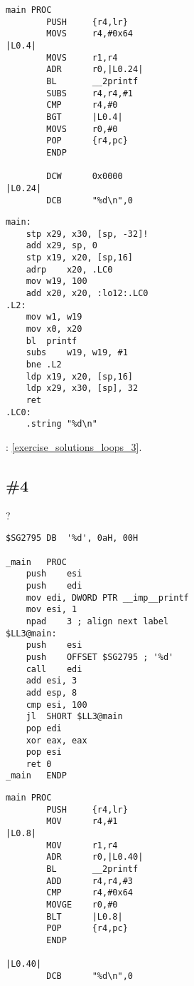 \begin{lstlisting}[caption=\NonOptimizingKeilVI (\ThumbMode)]
main PROC
        PUSH     {r4,lr}
        MOVS     r4,#0x64
|L0.4|
        MOVS     r1,r4
        ADR      r0,|L0.24|
        BL       __2printf
        SUBS     r4,r4,#1
        CMP      r4,#0
        BGT      |L0.4|
        MOVS     r0,#0
        POP      {r4,pc}
        ENDP

        DCW      0x0000
|L0.24|
        DCB      "%d\n",0
\end{lstlisting}

\begin{lstlisting}[caption=\Optimizing GCC 4.9 (ARM64)]
main:
	stp	x29, x30, [sp, -32]!
	add	x29, sp, 0
	stp	x19, x20, [sp,16]
	adrp	x20, .LC0
	mov	w19, 100
	add	x20, x20, :lo12:.LC0
.L2:
	mov	w1, w19
	mov	x0, x20
	bl	printf
	subs	w19, w19, #1
	bne	.L2
	ldp	x19, x20, [sp,16]
	ldp	x29, x30, [sp], 32
	ret
.LC0:
	.string	"%d\n"
\end{lstlisting}



: \ref{exercise_solutions_loops_3}.

\subsection{\Exercise \#4}
\label{exercise_loops_4}

?

\begin{lstlisting}[caption=\Optimizing MSVC 2010]
$SG2795	DB	'%d', 0aH, 00H

_main	PROC
	push	esi
	push	edi
	mov	edi, DWORD PTR __imp__printf
	mov	esi, 1
	npad	3 ; align next label
$LL3@main:
	push	esi
	push	OFFSET $SG2795 ; '%d'
	call	edi
	add	esi, 3
	add	esp, 8
	cmp	esi, 100
	jl	SHORT $LL3@main
	pop	edi
	xor	eax, eax
	pop	esi
	ret	0
_main	ENDP
\end{lstlisting}

\begin{lstlisting}[caption=\NonOptimizingKeilVI (\ARMMode)]
main PROC
        PUSH     {r4,lr}
        MOV      r4,#1
|L0.8|
        MOV      r1,r4
        ADR      r0,|L0.40|
        BL       __2printf
        ADD      r4,r4,#3
        CMP      r4,#0x64
        MOVGE    r0,#0
        BLT      |L0.8|
        POP      {r4,pc}
        ENDP

|L0.40|
        DCB      "%d\n",0
\end{lstlisting}

